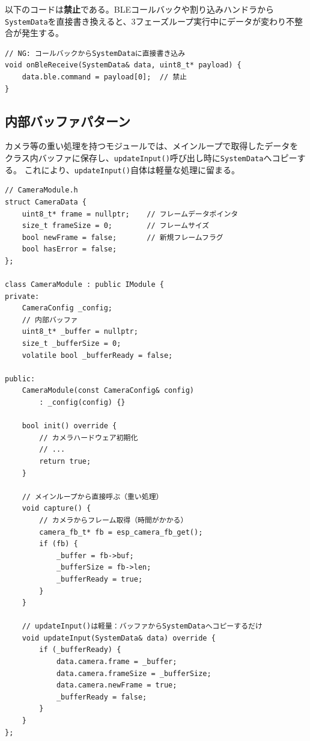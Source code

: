 \begin{cautionbox}[SystemDataへの直接アクセス禁止]
以下のコードは\textbf{禁止}である。BLEコールバックや割り込みハンドラから
\texttt{SystemData}を直接書き換えると、3フェーズループ実行中にデータが変わり不整合が発生する。
\begin{lstlisting}[style=cppstyle]
// NG: コールバックからSystemDataに直接書き込み
void onBleReceive(SystemData& data, uint8_t* payload) {
    data.ble.command = payload[0];  // 禁止
}
\end{lstlisting}
\end{cautionbox}

\subsection{内部バッファパターン}

カメラ等の重い処理を持つモジュールでは、メインループで取得したデータを
クラス内バッファに保存し、\texttt{updateInput()}呼び出し時に\texttt{SystemData}へコピーする。
これにより、\texttt{updateInput()}自体は軽量な処理に留まる。

\begin{lstlisting}[style=cppstyle, caption={内部バッファパターンの実装例}]
// CameraModule.h
struct CameraData {
    uint8_t* frame = nullptr;    // フレームデータポインタ
    size_t frameSize = 0;        // フレームサイズ
    bool newFrame = false;       // 新規フレームフラグ
    bool hasError = false;
};

class CameraModule : public IModule {
private:
    CameraConfig _config;
    // 内部バッファ
    uint8_t* _buffer = nullptr;
    size_t _bufferSize = 0;
    volatile bool _bufferReady = false;

public:
    CameraModule(const CameraConfig& config)
        : _config(config) {}

    bool init() override {
        // カメラハードウェア初期化
        // ...
        return true;
    }

    // メインループから直接呼ぶ（重い処理）
    void capture() {
        // カメラからフレーム取得（時間がかかる）
        camera_fb_t* fb = esp_camera_fb_get();
        if (fb) {
            _buffer = fb->buf;
            _bufferSize = fb->len;
            _bufferReady = true;
        }
    }

    // updateInput()は軽量：バッファからSystemDataへコピーするだけ
    void updateInput(SystemData& data) override {
        if (_bufferReady) {
            data.camera.frame = _buffer;
            data.camera.frameSize = _bufferSize;
            data.camera.newFrame = true;
            _bufferReady = false;
        }
    }
};
\end{lstlisting}

